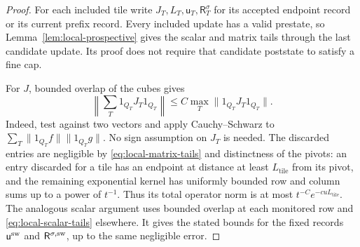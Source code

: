 \begin{proof}
For each included tile write \(J_T,L_T,\mathsf u_T,\mathsf R^\sigma_T\)
for its accepted endpoint record or its current prefix record.  Every
included update has a valid prestate, so
Lemma~\ref{lem:local-prospective} gives the scalar and matrix tails
through the last candidate update.  Its proof does not require that
candidate poststate to satisfy a fine cap.

For \(J\), bounded overlap of the cubes gives
\[
 \left\|\sum_T1_{Q_T}J_T1_{Q_T}\right\|
 \le C\max_T\|1_{Q_T}J_T1_{Q_T}\|.
\]
Indeed, test against two vectors and apply Cauchy--Schwarz to
\(\sum_T\|1_{Q_T}f\|\|1_{Q_T}g\|\).  No sign assumption on \(J_T\)
is needed.  The discarded entries are negligible by
\eqref{eq:local-matrix-tails} and distinctness of the pivots: an entry
discarded for a tile has an endpoint at distance at least
\(L_{\mathrm{tile}}\) from its pivot, and the remaining exponential
kernel has uniformly bounded row and column sums up to a power of
\(t^{-1}\).  Thus its total operator norm is at most
\(t^{-C}e^{-cuL_{\mathrm{tile}}}\).  The analogous scalar argument uses
bounded overlap at each monitored row and
\eqref{eq:local-scalar-tails} elsewhere.  It gives the stated bounds
for the fixed records \(\mathsf u^{\rm sw}\) and
\(\mathsf R^{\sigma,\rm sw}\), up to the same negligible error.


\end{proof}
